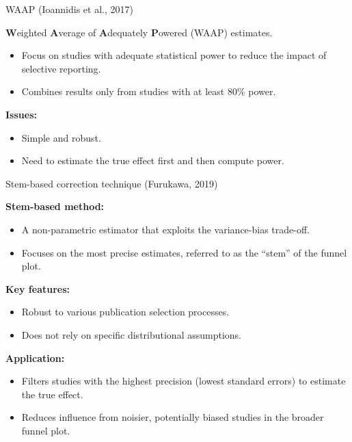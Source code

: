 \documentclass{beamer} %
\begin{document}
\begin{frame}{WAAP (Ioannidis et al., 2017)}

          \textbf{W}eighted \textbf{A}verage of \textbf{A}dequately \textbf{P}owered (WAAP) estimates.
					
						\bigskip

        \begin{itemize}
            \item Focus on studies with adequate statistical power to reduce the impact of selective reporting.
            \item Combines results only from studies with at least 80\% power.
        \end{itemize}
				
				\bigskip
				
       \textbf{Issues:}
        \begin{itemize}
            \item Simple and robust.
            \item Need to estimate the true effect first and then compute power.
        \end{itemize}

\end{frame}

\begin{frame}{Stem-based correction technique (Furukawa, 2019)}

\textbf{Stem-based method:}
\begin{itemize}
    \item A non-parametric estimator that exploits the variance-bias trade-off.
    \item Focuses on the most precise estimates, referred to as the ``stem'' of the funnel plot.
\end{itemize}

\bigskip

\textbf{Key features:}
\begin{itemize}
    \item Robust to various publication selection processes.
    \item Does not rely on specific distributional assumptions.
\end{itemize}

\bigskip

\textbf{Application:}
\begin{itemize}
    \item Filters studies with the highest precision (lowest standard errors) to estimate the true effect.
    \item Reduces influence from noisier, potentially biased studies in the broader funnel plot.
\end{itemize}

\end{frame}
\end{document}
